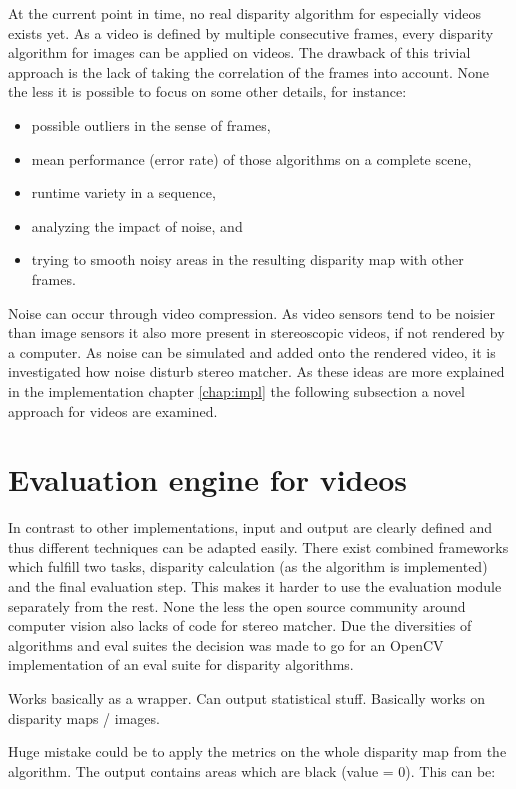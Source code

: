 At the current point in time, no real disparity algorithm for especially videos exists yet.
As a video is defined by multiple consecutive frames, every disparity algorithm for images can be applied on videos.
The drawback of this trivial approach is the lack of taking the correlation of the frames into account.
None the less it is possible to focus on some other details, for instance:

\begin{itemize}
  \item possible outliers in the sense of frames,
  \item mean performance (error rate) of those algorithms on a complete scene,
  \item runtime variety in a sequence,
  \item analyzing the impact of noise, and
  \item trying to smooth noisy areas in the resulting disparity map with other frames.
\end{itemize}

\noindent Noise can occur through video compression.
As video sensors tend to be noisier than image sensors it also more present in stereoscopic videos, if not rendered by a computer.
As noise can be simulated and added onto the rendered video, it is investigated how noise disturb stereo matcher.
As these ideas are more explained in the implementation chapter \ref{chap:impl} the following subsection a novel approach for videos are examined.

\section{Evaluation engine for videos}

In contrast to other implementations, input and output are clearly defined and thus different techniques can be adapted easily.
There exist combined frameworks which fulfill two tasks, disparity calculation (as the algorithm is implemented) and the final evaluation step.
This makes it harder to use the evaluation module separately from the rest.
None the less the open source community around computer vision also lacks of code for stereo matcher.
Due the diversities of algorithms and eval suites the decision was made to go for an OpenCV implementation of an eval suite for disparity algorithms.

Works basically as a wrapper. Can output statistical stuff. Basically works on disparity maps / images.

Huge mistake could be to apply the metrics on the whole disparity map from the algorithm. The output contains areas which are black (value = 0). This can be:

